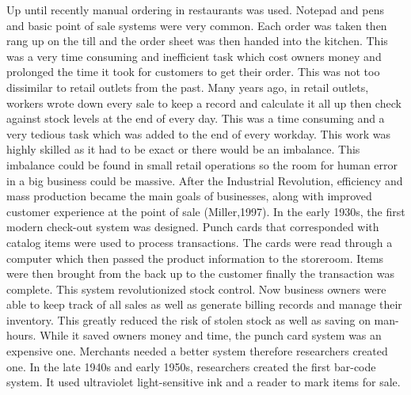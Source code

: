 Up until recently manual ordering in restaurants was used. Notepad and pens and basic point of sale systems were very common. Each order was taken then rang up on the till and the order sheet was then handed into the kitchen. This was a very time consuming and inefficient task which cost owners money and prolonged the time it took for customers to get their order. This was not too dissimilar to retail outlets from the past.
\newline
\newline
Many years ago, in retail outlets, workers wrote down every sale to keep a record and calculate it all up then check against stock levels at the end of every day. This was a time consuming and a very tedious task which was added to the end of every workday. This work was highly skilled as it had to be exact or there would be an imbalance. This imbalance could be found in small retail operations so the room for human error in a big business could be massive. 
\newline
\newline
After the Industrial Revolution, efficiency and mass production became the main goals of businesses, along with improved customer experience at the point of sale (Miller,1997). In the early 1930s, the first modern check-out system was designed. Punch cards that corresponded with catalog items were used to process transactions. The cards were read through a computer which then passed the product information to the storeroom. Items were then brought from the back up to the customer finally the transaction was complete. This system revolutionized stock control. Now business owners were able to keep track of all sales as well as generate billing records and manage their inventory. This greatly reduced the risk of stolen stock as well as saving on man-hours.
\newline
\newline
While it saved owners money and time, the punch card system was an expensive one. Merchants needed a better system therefore researchers created one. In the late 1940s and early 1950s, researchers created the first bar-code system. It used ultraviolet light-sensitive ink and a reader to mark items for sale.

